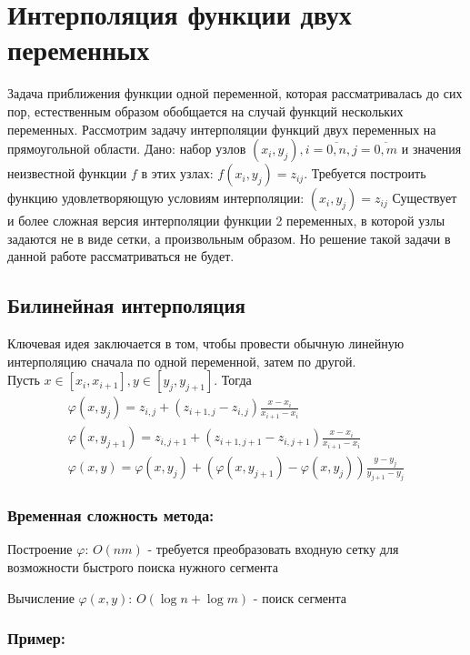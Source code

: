 \section{Интерполяция функции двух переменных}

Задача приближения функции одной переменной, которая рассматривалась до сих пор, естественным образом обобщается на случай функций нескольких переменных. Рассмотрим задачу интерполяции функций двух переменных на прямоугольной области. Дано: набор узлов $(x_i,y_j), i=\overline{0,n}, j=\overline{0,m}$ и значения неизвестной функции $f$ в этих узлах: $f(x_i,y_j)=z_{ij}$. Требуется построить функцию удовлетворяющую условиям интерполяции: $(x_i,y_j) = z_{ij}$
Существует и более сложная версия интерполяции функции 2 переменных, в которой узлы задаются не в виде сетки, а  произвольным образом. Но решение такой задачи в данной работе рассматриваться не будет.

\subsection{Билинейная интерполяция}

Ключевая идея заключается в том, чтобы провести обычную линейную интерполяцию сначала по одной переменной, затем по другой. \\
\noindent Пусть $x \in [x_i,x_{i+1}], y \in [y_j,y_{j+1}]$. Тогда
\begin{equation}
  \begin{gathered}
    \varphi(x, y_j) = z_{i,j} + (z_{i+1,j} - z_{i,j}) \frac{x-x_i}{x_{i+1} - x_i} \\
    \varphi(x, y_{j+1}) = z_{i,j+1} + (z_{i+1,j+1} - z_{i,j+1}) \frac{x-x_i}{x_{i+1} - x_i} \\
    \varphi(x,y) = \varphi(x,y_j) + (\varphi(x, y_{j+1}) - \varphi(x, y_j)) \frac{y-y_j}{y_{j+1} - y_j}
  \end{gathered}
\end{equation}

\subsubsection{Временная сложность метода:}

Построение $\varphi$: $O(n m)$ - требуется преобразовать входную сетку для возможности быстрого поиска нужного сегмента

Вычисление $\varphi(x, y)$: $O(\log n + \log m)$ - поиск сегмента

\subsubsection{Пример:}

